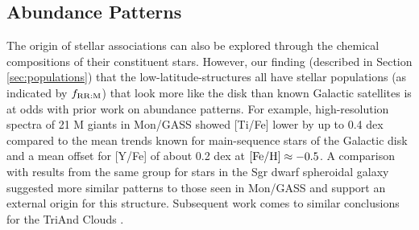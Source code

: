 \documentclass[galaxies,article,submit,moreauthors,pdftex,10pt,a4paper]{mdpi}
\begin{document}

\subsection{Abundance Patterns}

\label{sec:abundances}

The origin of stellar associations can also be explored through the chemical compositions of their constituent stars.
However, our finding (described in Section \ref{sec:populations}) that the low-latitude-structures all have stellar populations (as indicated by $f_{\rm RR:M}$) that look more like the disk than known Galactic satellites is at odds with prior work on abundance patterns.
For example, high-resolution spectra of 21 M giants in Mon/GASS \cite{chou2010b} showed
[Ti/Fe] lower by up to 0.4 dex compared to the mean trends known for main-sequence stars of the Galactic disk \cite[e.g.,][]{reddy03,bensby2014} and a mean offset for [Y/Fe] of about 0.2 dex at ${\rm [Fe/H]} \approx -0.5$. A comparison with results from the same group for stars in the Sgr dwarf spheroidal galaxy \cite{chou2010a} suggested more similar patterns to those seen in Mon/GASS and support  an external origin for this structure. Subsequent work comes to similar conclusions for the TriAnd Clouds \cite{chou11}.

\end{document}
